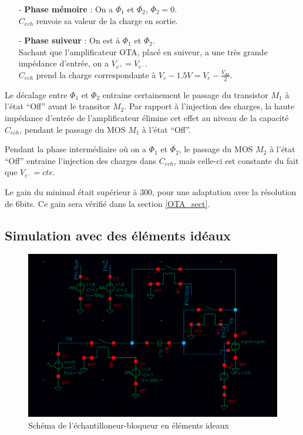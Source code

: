 \documentclass[11pt]{article}
\begin{document}
\begin{itemize}
  \item[-]\textbf{Phase m\'emoire} : On a $\overline{\Phi_1}$ et $\overline{\Phi_2}$, $\Phi_2 = 0$.\\
  $C_{ech}$ renvoie sa valeur de la charge en sortie.
  \item[-]\textbf{Phase suiveur} : On est \`a $\Phi_1$ et $\Phi_2$.\\
  Sachant que l'amplificateur OTA, plac\'e en suiveur, a une tr\`es grande imp\'edance d'entr\'ee, on a $V_{e^{+}} = V_{e^{-}}$.\\
  $C_{ech}$ prend la charge correspondante \`a $V_e - 1.5 V = V_e - \frac{V_{dd}}{2}$.
 \end{itemize}

Le d\'ecalage entre $\Phi_1$ et $\Phi_2$ entraine certainement le passage du transistor $M_1$ \`a l'\'etat ``Off'' avant le transitor
$M_2$. Par rapport \`a l'injection des charges, la haute imp\'edance d'entr\'ee de l'amplificateur \'elimine cet effet au niveau
de la capacit\'e $C_{ech}$, pendant le passage du MOS $M_1$ \`a l'\'etat ``Off''.

Pendant la phase interm\'ediaire o\`u on a $\Phi_1$ et $\overline{\Phi_2}$, le passage du MOS $M_2$ \`a l'\'etat ``Off'' entraine
l'injection des charges dans $C_{ech}$, mais celle-ci est constante du fait que $V_{e^{-}} = cte$.

Le gain du minimal \'etait sup\'erieur \`a 300, pour une adaptation avec la r\'esolution de 6bits. Ce gain sera v\'erifi\'e
dans la section \ref{OTA_sect}.

\subsection{Simulation avec des \'el\'ements id\'eaux}

\begin{figure}[!htb]
\begin{center}
  \includegraphics[scale=0.30]{Echantillonneur-bloqueur_ideal.png}
  \caption{Sch\'ema de l'\'echantilloneur-bloqueur en \'el\'ements ideaux}
\end{center}
\end{figure}
\end{document}
